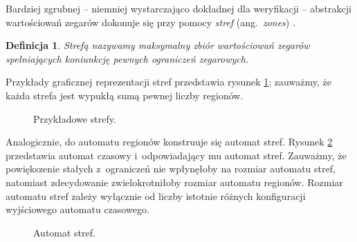 \documentclass{pracamgr}
\newcommand{\ang}[1]{(ang.~\emph{#1})}
\theoremstyle{plain}
\newtheorem{definition}{Definicja}
\begin{document}
Bardziej zgrubnej -- niemniej wystarczająco dokładnej dla
weryfikacji -- abstrakcji wartościowań zegarów dokonuje się przy pomocy
\emph{stref} \ang{zones} \cite{henz-94}.
\begin{definition}
  Strefą nazywamy maksymalny zbiór wartościowań zegarów spełniających
  koniunkcję pewnych ograniczeń zegarowych.
\end{definition}
Przykłady graficznej reprezentacji stref przedstawia rysunek
\ref{img:zones}; zauważmy, że każda strefa jest wypukłą sumą pewnej
liczby regionów.
\begin{figure}
  \centering
  \hspace{1.5cm}
  \caption{Przykładowe strefy.}
  \label{img:zones}
\end{figure}

Analogicznie, do automatu regionów konstruuje się automat stref.
Rysunek \ref{img:zones-automaton} przedstawia automat czasowy
i~odpowiadający mu automat stref. Zauważmy, że powiększenie stałych
z~ograniczeń nie wpłynęłoby na rozmiar automatu stref, natomiast
zdecydowanie zwielokrotniłoby rozmiar automatu regionów. Rozmiar
automatu stref zależy wyłącznie od liczby istotnie różnych
konfiguracji wyjściowego automatu czasowego.
\begin{figure}
  \centering
   \hspace{1cm}
  \caption{Automat stref.}
  \label{img:zones-automaton}
\end{figure}
\end{document}
